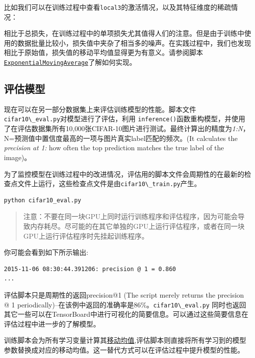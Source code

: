 比如我们可以在训练过程中查看\lstinline{local3}的激活情况，以及其特征维度的稀疏情况：

相比于总损失，在训练过程中的单项损失尤其值得人们的注意。但是由于训练中使用的数据批量比较小，损失值中夹杂了相当多的噪声。在实践过程中，我们也发现相比于原始值，损失值的移动平均值显得更为有意义。请参阅脚本\href{https://github.com/jikexueyuanwiki/tensorflow-zh/blob/master/SOURCE/api_docs/python/train.md\#ExponentialMovingAverage}{\lstinline{ExponentialMovingAverage}}了解如何实现。

\hypertarget{ux8bc4ux4f30ux6a21ux578b}{\subsection{评估模型
}\label{ux8bc4ux4f30ux6a21ux578b}}

现在可以在另一部分数据集上来评估训练模型的性能。脚本文件\lstinline{cifar10\_eval.py}对模型进行了评估，利用
\lstinline{inference()}函数重构模型，并使用了在评估数据集所有10,000张CIFAR-10图片进行测试。最终计算出的精度为\emph{1:N}，N=预测值中置信度最高的一项与图片真实label匹配的频次。(It
calculates the \emph{precision at 1:} how often the top prediction
matches the true label of the image)。

为了监控模型在训练过程中的改进情况，评估用的脚本文件会周期性的在最新的检查点文件上运行，这些检查点文件是由\lstinline{cifar10\_train.py}产生。

\begin{lstlisting}
python cifar10_eval.py
\end{lstlisting}

\begin{quote}
注意：不要在同一块GPU上同时运行训练程序和评估程序，因为可能会导致内存耗尽。尽可能的在其它单独的GPU上运行评估程序，或者在同一块GPU上运行评估程序时先挂起训练程序。
\end{quote}

你可能会看到如下所示输出:

\begin{lstlisting}
2015-11-06 08:30:44.391206: precision @ 1 = 0.860
...
\end{lstlisting}

评估脚本只是周期性的返回precision@1 (The script merely returns the
precision @ 1
periodically)--在该例中返回的准确率是86\%。\lstinline{cifar10\_eval.py}
同时也返回其它一些可以在TensorBoard中进行可视化的简要信息。可以通过这些简要信息在评估过程中进一步的了解模型。

训练脚本会为所有学习变量计算其\href{https://github.com/jikexueyuanwiki/tensorflow-zh/blob/master/SOURCE/api_docs/python/train.md\#ExponentialMovingAverage}{移动均值},评估脚本则直接将所有学习到的模型参数替换成对应的移动均值。这一替代方式可以在评估过程中提升模型的性能。

